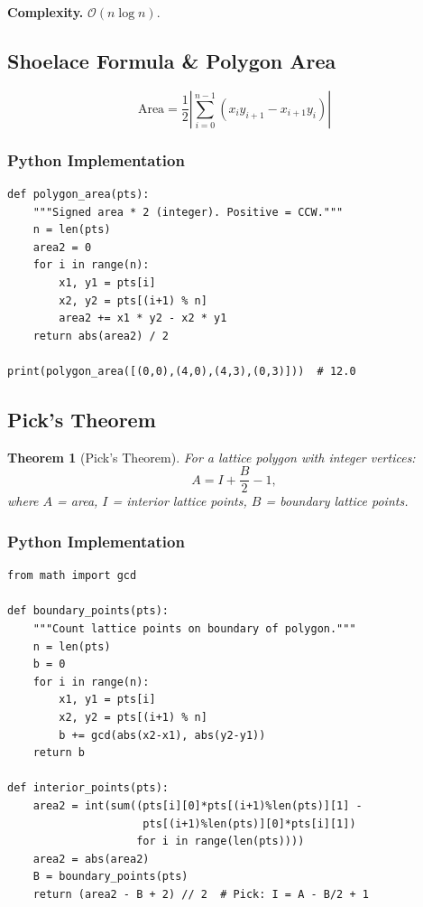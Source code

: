 \documentclass[10pt,a4paper]{article}
\theoremstyle{cpstyle}
\newtheorem{theorem}{Theorem}[section]
\newcommand{\bigO}[1]{\mathcal{O}\!\left(#1\right)}
\begin{document}
\textbf{Complexity.} $\bigO{n \log n}$.

\subsection{Shoelace Formula \& Polygon Area}

\[
  \text{Area} = \frac{1}{2}\left|\sum_{i=0}^{n-1}(x_i y_{i+1} - x_{i+1} y_i)\right|
\]

\subsubsection{Python Implementation}
\begin{lstlisting}[caption={Shoelace formula for polygon area}]
def polygon_area(pts):
    """Signed area * 2 (integer). Positive = CCW."""
    n = len(pts)
    area2 = 0
    for i in range(n):
        x1, y1 = pts[i]
        x2, y2 = pts[(i+1) % n]
        area2 += x1 * y2 - x2 * y1
    return abs(area2) / 2

print(polygon_area([(0,0),(4,0),(4,3),(0,3)]))  # 12.0
\end{lstlisting}

\subsection{Pick's Theorem}

\begin{theorem}[Pick's Theorem]
For a lattice polygon with integer vertices:
\[
  A = I + \frac{B}{2} - 1,
\]
where $A$ = area, $I$ = interior lattice points, $B$ = boundary lattice points.
\end{theorem}

\subsubsection{Python Implementation}
\begin{lstlisting}[caption={Pick's Theorem -- interior lattice points}]
from math import gcd

def boundary_points(pts):
    """Count lattice points on boundary of polygon."""
    n = len(pts)
    b = 0
    for i in range(n):
        x1, y1 = pts[i]
        x2, y2 = pts[(i+1) % n]
        b += gcd(abs(x2-x1), abs(y2-y1))
    return b

def interior_points(pts):
    area2 = int(sum((pts[i][0]*pts[(i+1)%len(pts)][1] -
                     pts[(i+1)%len(pts)][0]*pts[i][1])
                    for i in range(len(pts))))
    area2 = abs(area2)
    B = boundary_points(pts)
    return (area2 - B + 2) // 2  # Pick: I = A - B/2 + 1
\end{lstlisting}
\end{document}

